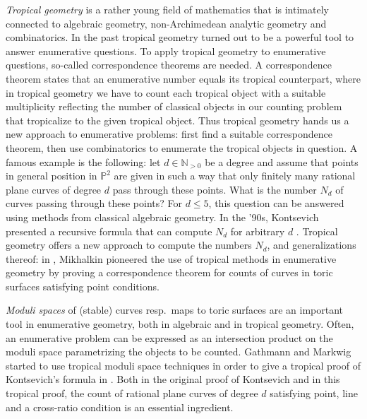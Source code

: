 \documentclass[11pt,reqno,a4]{amsart}
\theoremstyle{dotless}
\theoremstyle{definition}
\begin{document}
\textit{Tropical geometry} is a rather young field of mathematics that is intimately connected to algebraic geometry, non-Archimedean analytic geometry and combinatorics. In the past tropical geometry turned out to be a powerful tool to answer enumerative questions. To apply tropical geometry to enumerative questions, so-called correspondence theorems are needed. A correspondence theorem states that an enumerative number equals its tropical counterpart, where in tropical geometry we have to count each tropical object with a suitable multiplicity reflecting the number of classical objects in our counting problem that tropicalize to the given tropical object.
Thus tropical geometry hands us a new approach to enumerative problems: first find a suitable correspondence theorem, then use combinatorics to enumerate the tropical objects in question. A famous example is the following: let $d\in\mathbb{N}_{>0}$ be a degree and assume that points in general position in $\mathbb{P}^2$ are given in  such a way that only finitely many rational plane curves of degree $d$ pass through these points. What is the number $N_d$ of curves passing through these points? For $d\leq 5$, this question can be answered using methods from classical algebraic geometry. In the '90s, Kontsevich presented a recursive formula that can compute $N_d$ for arbitrary $d$ \cite{KontsevichOriginal}. Tropical geometry offers a new approach to compute the numbers $N_d$, and generalizations thereof: in \cite{MikhalkinFundamental}, Mikhalkin pioneered the use of tropical methods in enumerative geometry by proving a correspondence theorem for counts of curves in toric surfaces satisfying point conditions. 

\textit{Moduli spaces} of (stable) curves resp.\ maps to toric surfaces are an important tool in enumerative geometry, both in algebraic and in tropical geometry. Often, an enumerative problem can be expressed as an intersection product on the moduli space parametrizing the objects to be counted.
Gathmann and Markwig started to use tropical moduli space techniques in order to give a tropical proof of Kontsevich's formula in \cite{KontsevichPaper}. 
Both in the original proof of Kontsevich and in this tropical proof, the count of rational plane curves of degree $d$ satisfying point, line and a cross-ratio condition is an essential ingredient.
\end{document}

